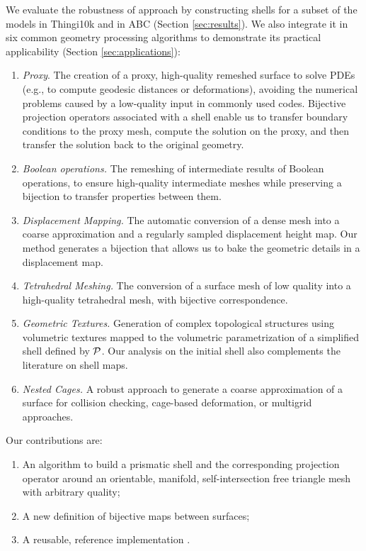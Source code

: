 We evaluate the robustness of approach by constructing shells for a subset of the models in Thingi10k \cite{zhou2016thingi10k} and in ABC \cite{Koch_2019_CVPR} (Section \ref{sec:results}). We also integrate it in six common geometry processing algorithms to demonstrate its practical applicability (Section \ref{sec:applications}):
\begin{enumerate}
    \item \emph{Proxy}.
    The creation of a proxy, high-quality remeshed surface to solve PDEs (e.g., to compute geodesic distances or deformations), avoiding the numerical problems caused by a low-quality input in commonly used codes.
    Bijective projection operators associated with a shell enable us to transfer boundary conditions to the proxy mesh, compute the solution on the proxy, and then transfer the solution back to the original geometry.
    \item \emph{Boolean operations.} The remeshing of intermediate results of Boolean operations, to ensure high-quality intermediate meshes while preserving a bijection to transfer properties between them.
    \item \emph{Displacement Mapping.} The automatic conversion of a dense mesh into a coarse approximation and a regularly sampled displacement height map. Our method generates a  bijection that allows us to bake the geometric details in a displacement map.
    \item \emph{Tetrahedral Meshing.} The conversion of a surface mesh of low quality into a high-quality tetrahedral mesh, with bijective correspondence.
    \item \emph{Geometric Textures.} Generation of complex topological structures using volumetric textures mapped to the volumetric parametrization of a simplified shell defined by $\P$. Our analysis on the initial shell also complements the literature on shell maps.
    \item \emph{Nested Cages.} A robust approach to generate a coarse approximation of a surface for collision checking, cage-based deformation, or multigrid approaches.
\end{enumerate}

Our contributions are:
\begin{enumerate}
    \item An algorithm to build a prismatic shell and the corresponding projection operator around an orientable, manifold, self-intersection free triangle mesh with arbitrary quality;
    \item A new definition of bijective maps between  surfaces;%
    \item A reusable, reference implementation .
\end{enumerate}
